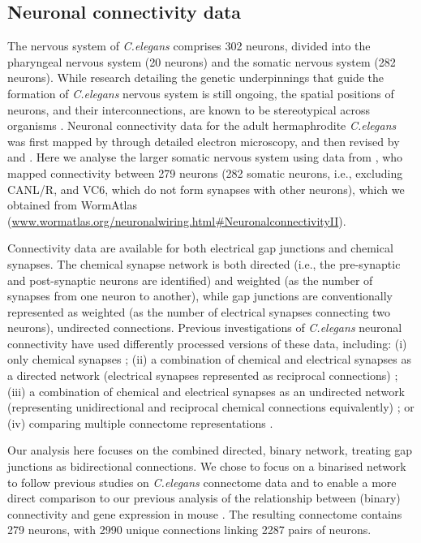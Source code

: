 \subsection*{Neuronal connectivity data}
The nervous system of \emph{C.elegans} comprises 302 neurons, divided into the pharyngeal nervous system (20 neurons) and the somatic nervous system (282 neurons).
While research detailing the genetic underpinnings that guide the formation of \textit{C.elegans} nervous system is still ongoing, the spatial positions of neurons, and their interconnections, are known to be stereotypical across organisms \citep{Riddle1997}.
Neuronal connectivity data for the adult hermaphrodite \emph{C.elegans} was first mapped by \citet{White1986} through detailed electron microscopy, and then revised by \mbox{\citet{Chen2006}} and \citet{Varshney2011}.
Here we analyse the larger somatic nervous system using data from \citet{Varshney2011}, who mapped connectivity between 279 neurons (282 somatic neurons, i.e., excluding CANL/R, and VC6, which do not form synapses with other neurons), which we obtained from WormAtlas \citep{WormAtlas} (\url{www.wormatlas.org/neuronalwiring.html#NeuronalconnectivityII}).

Connectivity data are available for both electrical gap junctions and chemical synapses.
The chemical synapse network is both directed (i.e., the pre-synaptic and post-synaptic neurons are identified) and weighted (as the number of synapses from one neuron to another), while gap junctions are conventionally represented as weighted (as the number of electrical synapses connecting two neurons), undirected connections.
Previous investigations of \emph{C.elegans} neuronal connectivity have used differently processed versions of these data, including:
(i) only chemical synapses \mbox{\citep{Kashtan2004}};
(ii) a combination of chemical and electrical synapses as a directed network (electrical synapses represented as reciprocal connections) \citep{Azulay2016, Kim2016};
(iii) a combination of chemical and electrical synapses as an undirected network (representing unidirectional and reciprocal chemical connections equivalently) \citep{Towlson2013, Kim2014a, Pavlovic2014, Demesmaeker2017};
or (iv) comparing multiple connectome representations \mbox{\citep{Pan2010}}.

Our analysis here focuses on the combined directed, binary network, treating gap junctions as bidirectional connections.
We chose to focus on a binarised network to follow previous studies on \textit{C.elegans} connectome data \citep{Kaufman2006, Towlson2013, Varier2011, Varadan2006, Pavlovic2014} and to enable a more direct comparison to our previous analysis of the relationship between (binary) connectivity and gene expression in mouse \mbox{\citep{Fulcher2016}}.
The resulting connectome contains 279 neurons, with \num{2990} unique connections linking \num{2287} pairs of neurons.

